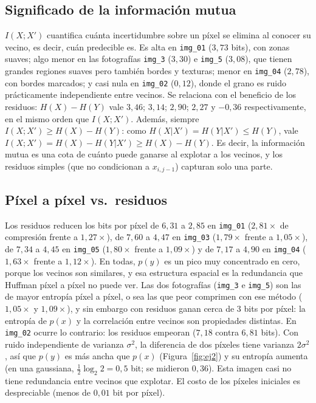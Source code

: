 \documentclass[11pt,a4paper]{article}
\begin{document}
\subsection{Significado de la información mutua}
$I(X;X')$ cuantifica cuánta incertidumbre sobre un píxel se elimina al conocer su vecino, es decir, cuán predecible es. Es alta en \texttt{img\_01} ($3{,}73$ bits), con zonas suaves; algo menor en las fotografías \texttt{img\_3} ($3{,}30$) e \texttt{img\_5} ($3{,}08$), que tienen grandes regiones suaves pero también bordes y texturas; menor en \texttt{img\_04} ($2{,}78$), con bordes marcados; y casi nula en \texttt{img\_02} ($0{,}12$), donde el grano es ruido prácticamente independiente entre vecinos. Se relaciona con el beneficio de los residuos: $H(X)-H(Y)$ vale $3{,}46$; $3{,}14$; $2{,}90$; $2{,}27$ y $-0{,}36$ respectivamente, en el mismo orden que $I(X;X')$. Además, siempre $I(X;X')\ge H(X)-H(Y)$: como $H(X|X')=H(Y|X')\le H(Y)$, vale $I(X;X')=H(X)-H(Y|X')\ge H(X)-H(Y)$. Es decir, la información mutua es una cota de cuánto puede ganarse al explotar a los vecinos, y los residuos simples (que no condicionan a $x_{i,j-1}$) capturan solo una parte.

\subsection{Píxel a píxel vs.\ residuos}
Los residuos reducen los bits por píxel de $6{,}31$ a $2{,}85$ en \texttt{img\_01} ($2{,}81\times$ de compresión frente a $1{,}27\times$), de $7{,}60$ a $4{,}47$ en \texttt{img\_03} ($1{,}79\times$ frente a $1{,}05\times$), de $7{,}34$ a $4{,}45$ en \texttt{img\_05} ($1{,}80\times$ frente a $1{,}09\times$) y de $7{,}17$ a $4{,}90$ en \texttt{img\_04} ($1{,}63\times$ frente a $1{,}12\times$). En todas, $p(y)$ es un pico muy concentrado en cero, porque los vecinos son similares, y esa estructura espacial es la redundancia que Huffman píxel a píxel no puede ver. Las dos fotografías (\texttt{img\_3} e \texttt{img\_5}) son las de mayor entropía píxel a píxel, o sea las que peor comprimen con ese método ($1{,}05\times$ y $1{,}09\times$), y sin embargo con residuos ganan cerca de $3$ bits por píxel: la entropía de $p(x)$ y la correlación entre vecinos son propiedades distintas. En \texttt{img\_02} ocurre lo contrario: los residuos empeoran ($7{,}18$ contra $6{,}81$ bits). Con ruido independiente de varianza $\sigma^2$, la diferencia de dos píxeles tiene varianza $2\sigma^2$, así que $p(y)$ es más ancha que $p(x)$ (Figura~\ref{fig:ej2}) y su entropía aumenta (en una gaussiana, $\tfrac12\log_2 2=0{,}5$ bit; se midieron $0{,}36$). Esta imagen casi no tiene redundancia entre vecinos que explotar. El costo de los píxeles iniciales es despreciable (menos de $0{,}01$ bit por píxel).
\end{document}
